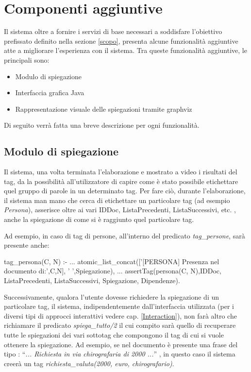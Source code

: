 
\section{Componenti aggiuntive}
Il sistema oltre a fornire i servizi di base necessari a soddisfare l'obiettivo prefissato definito nella sezione \ref{scopo}, presenta alcune funzionalità aggiuntive atte a migliorare l'esperienza con il sistema. Tra queste funzionalità aggiuntive, le principali sono:
\begin{itemize}
	\item Modulo di spiegazione
	\item Interfaccia grafica Java
	\item Rappresentazione visuale delle spiegazioni tramite graphviz
\end{itemize}
Di seguito verrà fatta una breve descrizione per ogni funzionalità.

\subsection{Modulo di spiegazione}
\label{spiega}
Il sistema, una volta terminata l'elaborazione e mostrato a video i risultati del tag, da la possibilità all'utilizzatore di capire come è stato possibile etichettare quel gruppo di parole in un determinato tag. Per fare ciò, durante l'elaborazione, il sistema man mano che cerca di etichettare un particolare tag (ad esempio \emph{Persona}), asserisce oltre ai vari IDDoc, ListaPrecedenti, ListaSuccessivi, etc. , anche la spiegazione di come si è raggiunto quel particolare tag.

Ad esempio, in caso di tag di persone, all'interno del predicato \emph{tag\_persone}, sarà presente anche:

\begin{prologcode}
 tag_persona(C, N) :-
   ...
   atomic_list_concat(['[PERSONA] Presenza nel documento di:',C,N],
                      ' ',Spiegazione),
   ...
   assertTag(persona(C, N),IDDoc, ListaPrecedenti, ListaSuccessivi,
            Spiegazione, Dipendenze).
\end{prologcode}

Successivamente, qualora l'utente dovesse richiedere la spiegazione di un particolare tag, il sistema, indipendentemente dall'interfaccia utilizzata (per i diversi tipi di approcci interattivi vedere cap. \ref{Interaction}), non farà altro che richiamare il predicato \emph{spiega\_tutto/2} il cui compito sarà quello di recuperare tutte le spiegazioni dei vari sottotag che compongono il tag di cui si vuole ottenere la spiegazione.
Ad esempio, se nel documento è presente una frase del tipo : ``\emph{... Richiesta in via chirografaria di 2000 \officialeuro ...}'' , in questo caso il sistema creerà un tag \emph{richiesta\_valuta(2000, euro, chirografario)}.

